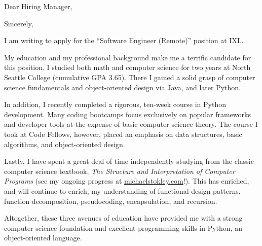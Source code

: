 \documentclass[10pt,a4paper,sans]{moderncv}        %
\begin{document}

\clearpage

\date{\today}
\opening{Dear Hiring Manager,}
\closing{Sincerely,}
\makelettertitle

I am writing to apply for the ``Software Engineer (Remote)'' position at IXL.

My education and my professional background make me a terrific candidate for
this position. I studied both math and computer science for two years at North
Seattle College (cumulative GPA 3.65). There I gained a solid grasp of computer science fundamentals and
object-oriented design via Java, and later Python. 

In addition, I recently completed a rigorous, ten-week course in Python
development. Many coding bootcamps focus exclusively on popular frameworks and
developer tools at the expense of basic computer science theory. The course I
took at Code Fellows, however, placed an emphasis on data structures, basic
algorithms, and object-oriented design. 

Lastly, I have spent a great deal of time independently studying from the classic computer science textbook, \textit{The Structure and Interpretation of Computer Programs} (see my ongoing progress at {\href{http://michaelstokley.com}{michaelstokley.com}}!). This has enriched, and will continue to enrich, my understanding of functional design patterns, function decomposition, pseudocoding, encapsulation, and recursion.

Altogether, these three avenues of education have provided me with a strong computer
science foundation and excellent programming skills in Python, an object-oriented language.
\end{document}
